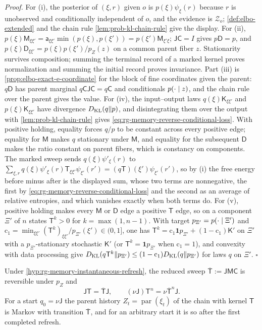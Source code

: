 \noindent\emph{Proof.}
For (i), the posterior of $(\xi,r)$ given $o$ is $p(\xi)\psi_\xi(r)$ because $r$
is unobserved and conditionally independent of $o$, and the evidence is
$\mathcal Z_o$; \cref{def:elbo-extended} and the chain rule
\cref{lem:prob-kl-chain-rule} give the display. For (ii),
$p(\xi)\mathsf M_{\xi\xi'}=\mathsf a_{\xi\xi'}\min(p(\xi),p(\xi'))=p(\xi')\mathsf M_{\xi'\xi}$;
$\mathsf J\mathsf C=I$ gives $p\mathsf D=p$, and
$p(\xi)\mathsf D_{\xi\xi'}=p(\xi)p(\xi')/p_Z(z)$ on a common parent fiber $z$.
Stationarity survives composition; summing the terminal record of a marked kernel
proves normalization and summing the initial record proves invariance. Part (iii) is
\cref{prop:elbo-exact-e-coordinate} for the block of fine coordinates given the
parent: $q\mathsf D$ has parent marginal $q\mathsf C\mathsf J\mathsf C=q\mathsf C$ and
conditionals $p(\cdot\mid z)$, and the chain rule over the parent gives the value.
For (iv), the input--output laws $q(\xi)\mathsf K_{\xi\xi'}$ and
$p(\xi)\mathsf K_{\xi\xi'}$ have divergence $D_{\mathrm{KL}}(q\Vert p)$, and disintegrating them
over the output with \cref{lem:prob-kl-chain-rule} gives
\eqref{eq:rg-memory-reverse-conditional-loss}. With positive holding, equality forces
$q/p$ to be constant across every positive edge; equality for $\mathsf M$ makes $q$
stationary under $\mathsf M$, and equality for the subsequent $\mathsf D$ makes the
ratio constant on parent fibers, which is constancy on components. The marked sweep
sends $q(\xi)\psi'_\xi(r)$ to
$\sum_{\xi,r}q(\xi)\psi'_\xi(r)\mathsf T_{\xi\xi'}\psi_{\xi'}(r')=(q\mathsf T)(\xi')\psi_{\xi'}(r')$,
so by (i) the free energy before minus after is the displayed sum, whose two
terms are nonnegative, the first by \eqref{eq:rg-memory-reverse-conditional-loss}
and the second as an average of relative entropies, and which vanishes exactly
when both terms do. For (v), positive
holding makes every $\mathsf M$ or $\mathsf D$ edge a positive $\mathsf T$ edge, so on
a component $\Xi'$ of $n$ states $\mathsf T^k>0$ for $k=\max(1,n-1)$. With target
$p_{\Xi'}=p(\cdot\mid\Xi')$ and
$\mathrm c_1=\min_{\xi\xi'}(\mathsf T^k)_{\xi\xi'}/p_{\Xi'}(\xi')\in(0,1]$, one has
$\mathsf T^k=\mathrm c_1\mathbf 1p_{\Xi'}+(1-\mathrm c_1)\mathsf K'$ on $\Xi'$ with a
$p_{\Xi'}$-stationary stochastic $\mathsf K'$ (or $\mathsf T^k=\mathbf 1p_{\Xi'}$ when
$\mathrm c_1=1$), and convexity with data processing give
$D_{\mathrm{KL}}(q\mathsf T^k\Vert p_{\Xi'})\leq(1-\mathrm c_1)D_{\mathrm{KL}}(q\Vert p_{\Xi'})$ for laws $q$ on
$\Xi'$. $\square$

Under \cref{hyp:rg-memory-instantaneous-refresh}, the reduced sweep
$\overline{\mathsf T}:=\mathsf J\mathsf M\mathsf C$ is reversible under $p_Z$ and
\begin{equation}
\mathsf J\mathsf T=\overline{\mathsf T}\mathsf J,
\qquad
(\nu\mathsf J)\mathsf T^n=\nu\overline{\mathsf T}^n\mathsf J.
\label{eq:rg-memory-parent-semiconjugacy}
\end{equation}
For a start $q_0=\nu\mathsf J$ the parent history $Z_t=\operatorname{par}(\xi_t)$
of the chain with kernel $\mathsf T$ is Markov with transition $\overline{\mathsf T}$,
and for an arbitrary start it is so after the first completed refresh.

